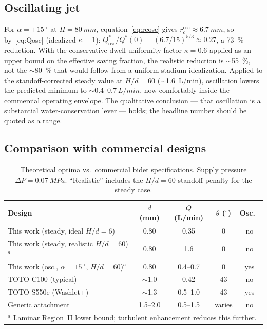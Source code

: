 \documentclass[10pt,letterpaper]{article}
\begin{document}
\subsection{Oscillating jet}

For $\alpha = \pm15~^\circ $ at $H = 80~mm$,
equation~\eqref{eq:rcosc} gives $r_c^\mathrm{osc} \approx 6.7~mm$,
so by~\eqref{eq:Qosc} (idealized $\kappa = 1$):
$Q^*_\mathrm{osc}/Q^*(0) = (6.7/15)^{5/3} \approx 0.27$, a
73~\% reduction. With the conservative dwell-uniformity
factor $\kappa = 0.6$ applied as an upper bound on the effective
saving fraction, the realistic reduction is $\sim$55~\%,
not the $\sim$80~\% that would follow from a uniform-stadium
idealization. Applied to the standoff-corrected steady value at $H/d = 60$
($\sim$1.6~L/min), oscillation lowers the predicted minimum to
$\sim 0.4$--$0.7~L/min$, now comfortably inside the commercial
operating envelope. The qualitative conclusion --- that oscillation is
a substantial water-conservation lever --- holds; the headline number
should be quoted as a range.

\subsection{Comparison with commercial designs}

\begin{table}[h]
\centering
\caption{Theoretical optima vs.\ commercial bidet specifications.
Supply pressure $\Delta P = 0.07~MPa$. ``Realistic'' includes
the $H/d = 60$ standoff penalty for the steady case.}
\label{tab:commercial}
\begin{tabular}{lcccc}
\toprule
Design & $d$ (mm) & $Q$ (L/min) & $\theta$ ($^\circ$) & Osc.\ \\
\midrule
This work (steady, ideal $H/d{=}6$)        & 0.80 & 0.35     & 0  & no  \\
This work (steady, realistic $H/d{=}60$)$^a$ & 0.80 & 1.6      & 0  & no  \\
This work (osc., $\alpha{=}15~^\circ $, $H/d{=}60$)$^a$ & 0.80 & 0.4--0.7 & 0 & yes \\
TOTO C100 (typical)        & $\sim$1.0 & 0.42     & 43 & no  \\
TOTO S550e (Washlet+)      & $\sim$1.3 & 0.5--1.0 & 43 & yes \\
Generic attachment         & 1.5--2.0  & 0.5--1.5 & varies & no \\
\bottomrule
\multicolumn{5}{l}{\footnotesize $^a$ Laminar Region~II lower bound;
turbulent enhancement reduces this further.}\\
\end{tabular}
\end{table}
\end{document}
